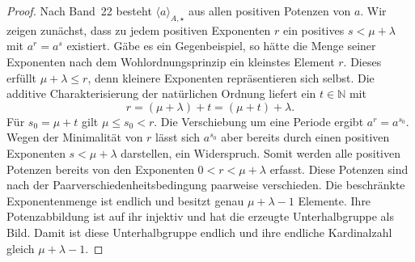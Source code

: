 \documentclass[main.tex]{subfiles}
\begin{document}
\begin{proof}
Nach Band~22 besteht \(\langle a\rangle_{A,\star}\) aus allen positiven
Potenzen von \(a\).  Wir zeigen zunächst, dass zu jedem positiven Exponenten
\(r\) ein positives \(s<\mu+\lambda\) mit \(a^r=a^s\) existiert.  Gäbe es
ein Gegenbeispiel, so hätte die Menge seiner Exponenten nach dem
Wohlordnungsprinzip ein kleinstes Element \(r\).  Dieses erfüllt
\(\mu+\lambda\leq r\), denn kleinere Exponenten repräsentieren sich selbst.
Die additive Charakterisierung der natürlichen Ordnung liefert ein
\(t\in\mathbb N\) mit
\[
  r=(\mu+\lambda)+t=(\mu+t)+\lambda.
\]
Für \(s_0=\mu+t\) gilt \(\mu\leq s_0<r\).  Die Verschiebung um eine
Periode ergibt \(a^r=a^{s_0}\).  Wegen der Minimalität von \(r\) lässt sich
\(a^{s_0}\) aber bereits durch einen positiven Exponenten
\(s<\mu+\lambda\) darstellen, ein Widerspruch.  Somit werden
alle positiven Potenzen bereits von den Exponenten
\(0<r<\mu+\lambda\) erfasst.  Diese Potenzen sind nach der
Paarverschiedenheitsbedingung paarweise verschieden.  Die beschränkte
  Exponentenmenge ist endlich und besitzt genau \(\mu+\lambda-1\)
Elemente.  Ihre Potenzabbildung ist auf ihr injektiv und hat die erzeugte
Unterhalbgruppe als Bild.  Damit ist diese Unterhalbgruppe endlich und ihre
  endliche Kardinalzahl gleich \(\mu+\lambda-1\).
\end{proof}

\end{document}
